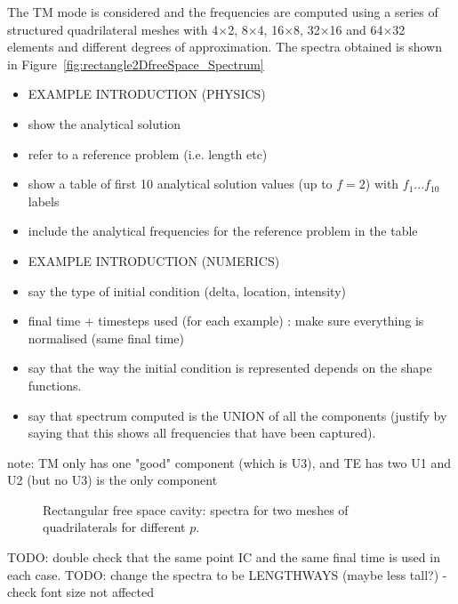 The TM mode is considered and the frequencies are computed using a series of
structured quadrilateral meshes with 4$\times$2, 8$\times$4, 16$\times$8,
32$\times$16 and 64$\times$32 elements and different degrees of approximation.
The spectra obtained is shown in Figure~\ref{fig:rectangle2DfreeSpace_Spectrum}
\begin{itemize}
\item EXAMPLE INTRODUCTION (PHYSICS)
\item show the analytical solution
\item refer to a reference problem (i.e. length etc)
\item show a table of first 10 analytical solution values (up to $f=2$) with $f_1...f_10$ labels
\item include the analytical frequencies for the reference problem in the table
\item EXAMPLE INTRODUCTION (NUMERICS)
\item say the type of initial condition (delta, location, intensity)
\item final time + timesteps used (for each example) : make sure everything is
  normalised (same final time)
\item say that the way the initial condition is represented depends on the shape functions.
\item say that spectrum computed is the UNION of all the components (justify by
  saying that this shows all frequencies that have been captured).
\end{itemize}

note: TM only has one "good" component (which is U3), and TE has two U1 and U2 (but no U3) is the only component 
\begin{figure}[!ht]
	\centering
	\caption{Rectangular free space cavity: spectra for two meshes of quadrilaterals for different $p$.}
	\label{fig:}
\end{figure}
TODO: double check that the same point IC and the same final time is used in each case.
TODO: change the spectra to be LENGTHWAYS (maybe less tall?) - check font size
not affected

